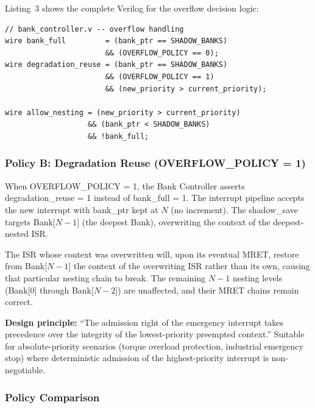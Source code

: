 \documentclass[letterpaper,journal]{IEEEtran}
\begin{document}
Listing~3 shows the complete Verilog for the overflow decision logic:

\begin{verbatim}
// bank_controller.v -- overflow handling
wire bank_full         = (bank_ptr == SHADOW_BANKS)
                       && (OVERFLOW_POLICY == 0);
wire degradation_reuse = (bank_ptr == SHADOW_BANKS)
                       && (OVERFLOW_POLICY == 1)
                       && (new_priority > current_priority);

wire allow_nesting = (new_priority > current_priority)
                   && (bank_ptr < SHADOW_BANKS)
                   && !bank_full;
\end{verbatim}

\subsubsection{Policy B: Degradation Reuse (OVERFLOW\_POLICY = 1)}

When OVERFLOW\_POLICY = 1, the Bank Controller asserts degradation\_reuse = 1 instead of bank\_full = 1.
The interrupt pipeline accepts the new interrupt with bank\_ptr kept at $N$ (no increment).
The shadow\_save targets Bank[$N-1$] (the deepest Bank), overwriting the context of the deepest-nested ISR.

The ISR whose context was overwritten will, upon its eventual MRET, restore from Bank[$N-1$] the context of the overwriting ISR rather than its own, causing that particular nesting chain to break.
The remaining $N-1$ nesting levels (Bank[0] through Bank[$N-2$]) are unaffected, and their MRET chains remain correct.

\textbf{Design principle:} ``The admission right of the emergency interrupt takes precedence over the integrity of the lowest-priority preempted context.''
Suitable for absolute-priority scenarios (torque overload protection, industrial emergency stop) where deterministic admission of the highest-priority interrupt is non-negotiable.

\subsubsection{Policy Comparison}
\end{document}
